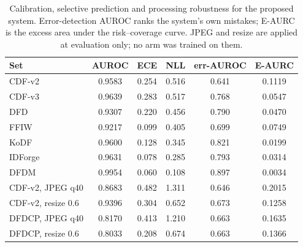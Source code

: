 \begin{table}[t]
\centering
\caption{Calibration, selective prediction and processing robustness for the proposed system. Error-detection AUROC ranks the system's own mistakes; E-AURC is the excess area under the risk--coverage curve. JPEG and resize are applied at evaluation only; no arm was trained on them.}
\label{tab:reliability}
\small
\begin{tabular}{lccccc}
\toprule
Set & AUROC & ECE & NLL & err-AUROC & E-AURC \\
\midrule
CDF-v2 & 0.9583 & 0.254 & 0.516 & 0.641 & 0.1119 \\
CDF-v3 & 0.9639 & 0.283 & 0.517 & 0.768 & 0.0547 \\
DFD & 0.9307 & 0.220 & 0.456 & 0.790 & 0.0470 \\
FFIW & 0.9217 & 0.099 & 0.405 & 0.699 & 0.0749 \\
KoDF & 0.9600 & 0.128 & 0.345 & 0.821 & 0.0199 \\
IDForge & 0.9631 & 0.078 & 0.285 & 0.793 & 0.0314 \\
DFDM & 0.9954 & 0.060 & 0.108 & 0.897 & 0.0034 \\
\midrule
CDF-v2, JPEG q40 & 0.8683 & 0.482 & 1.311 & 0.646 & 0.2015 \\
CDF-v2, resize 0.6 & 0.9396 & 0.304 & 0.652 & 0.673 & 0.1258 \\
DFDCP, JPEG q40 & 0.8170 & 0.413 & 1.210 & 0.663 & 0.1635 \\
DFDCP, resize 0.6 & 0.8033 & 0.208 & 0.674 & 0.663 & 0.1366 \\
\bottomrule
\end{tabular}
\end{table}
